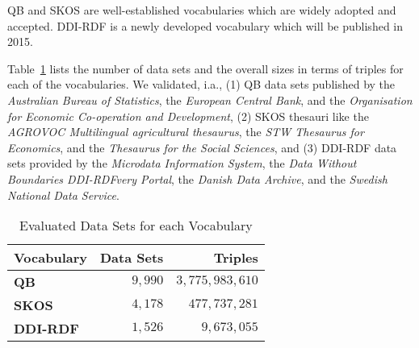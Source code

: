 \documentclass[conference]{IEEEtran}
\newcommand{\ke}[1]{\todo[size=\small, color=red!40]{\textbf{Kai:} #1}}
\begin{document}
QB and SKOS are well-established vocabularies which are widely adopted and accepted. DDI-RDF is a newly developed vocabulary which will be published in 2015.



Table~\ref{tab:datasets} lists the number of data sets and the overall sizes in terms of triples for each of the vocabularies. We validated, i.a., 
(1) QB data sets published by the \emph{Australian Bureau of Statistics},
the \emph{European Central Bank}, and the
\emph{Organisation for Economic Co-operation and Development},
(2) SKOS thesauri like the \emph{AGROVOC Multilingual agricultural thesaurus},
the \emph{STW Thesaurus for Economics}, and the
\emph{Thesaurus for the Social Sciences}, and
(3) DDI-RDF data sets provided by the \emph{Microdata Information System}, 
the \emph{Data Without Boundaries DDI-RDFvery Portal}, the
\emph{Danish Data Archive}, and the
\emph{Swedish National Data Service}.


\begin{table}[H]
		\scriptsize
    \begin{center}
		\caption{Evaluated Data Sets for each Vocabulary}
		\label{tab:datasets}
    \begin{tabular}{lrr}
           \textbf{Vocabulary}
           & \textbf{Data Sets}
           & \textbf{Triples}
					 
    \\ \midrule
		\textbf{QB} & $9,990$   & $3,775,983,610$  \\
		\textbf{SKOS} & $4,178$  & $477,737,281$ \\
		\textbf{DDI-RDF} & $1,526$  & $9,673,055$  \\
    \bottomrule
    \end{tabular}
    \end{center}
\end{table}
\end{document}
